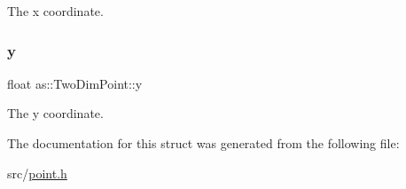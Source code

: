 The x coordinate. 

\mbox{\label{structas_1_1TwoDimPoint_a257d8f52b228b0fa8ea7f1c780626037}} 
\subsubsection{\texorpdfstring{y}{y}}
{\footnotesize\ttfamily float as\+::\+Two\+Dim\+Point\+::y}



The y coordinate. 



The documentation for this struct was generated from the following file\+:\begin{DoxyCompactItemize}
\item 
src/\hyperlink{point_8h}{point.\+h}\end{DoxyCompactItemize}
